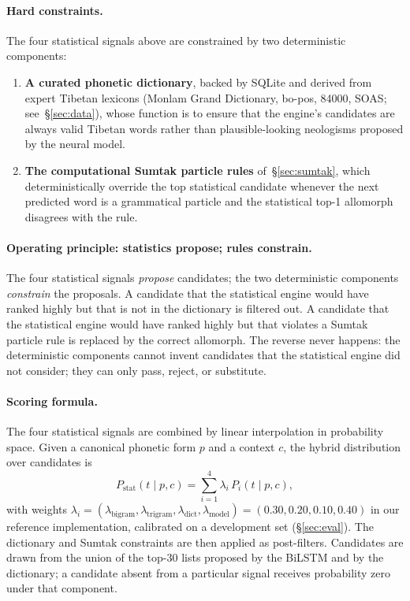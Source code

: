 \documentclass[11pt]{article}
\begin{document}
\paragraph{Hard constraints.} The four statistical signals above are constrained by two deterministic components:
\begin{enumerate}
\item[5.] \textbf{A curated phonetic dictionary}, backed by SQLite and derived from expert Tibetan lexicons (Monlam Grand Dictionary, bo-pos, 84000, SOAS; see~\S\ref{sec:data}), whose function is to ensure that the engine's candidates are always valid Tibetan words rather than plausible-looking neologisms proposed by the neural model.
\item[6.] \textbf{The computational Sumtak particle rules} of~\S\ref{sec:sumtak}, which deterministically override the top statistical candidate whenever the next predicted word is a grammatical particle and the statistical top-1 allomorph disagrees with the rule.
\end{enumerate}

\paragraph{Operating principle: statistics propose; rules constrain.} The four statistical signals \emph{propose} candidates; the two deterministic components \emph{constrain} the proposals. A candidate that the statistical engine would have ranked highly but that is not in the dictionary is filtered out. A candidate that the statistical engine would have ranked highly but that violates a Sumtak particle rule is replaced by the correct allomorph. The reverse never happens: the deterministic components cannot invent candidates that the statistical engine did not consider; they can only pass, reject, or substitute.

\paragraph{Scoring formula.} The four statistical signals are combined by linear interpolation in probability space. Given a canonical phonetic form $p$ and a context $c$, the hybrid distribution over candidates is
\[
P_{\text{stat}}(t \mid p, c) = \sum_{i=1}^{4} \lambda_i \, P_i(t \mid p, c),
\]
with weights $\lambda_i = (\lambda_{\text{bigram}}, \lambda_{\text{trigram}}, \lambda_{\text{dict}}, \lambda_{\text{model}}) = (0.30, 0.20, 0.10, 0.40)$ in our reference implementation, calibrated on a development set (\S\ref{sec:eval}). The dictionary and Sumtak constraints are then applied as post-filters. Candidates are drawn from the union of the top-30 lists proposed by the BiLSTM and by the dictionary; a candidate absent from a particular signal receives probability zero under that component.
\end{document}
